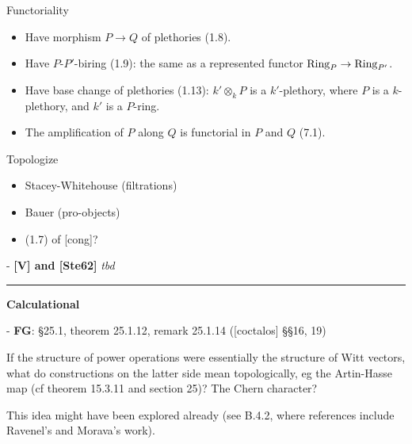 \documentclass{rs}
\theoremstyle{definition}
\theoremstyle{remark}
\renewcommand{\=}{\approx}
\renewcommand{\-}{\sim}
\numberwithin{equation}{section}
\numberwithin{thm}{section}
\begin{document}
Functoriality
\begin{itemize}
 \item Have morphism $P \to Q$ of plethories (1.8).

 \item Have $P$-$P'$-biring (1.9): the same as a represented functor ${\rm Ring}_P \to {\rm Ring}_{P'}$.

 \item Have base change of plethories (1.13): $k' \otimes_k P$ is a $k'$-plethory, where $P$ is a $k$-plethory, and $k'$ is a $P$-ring.

 \item The amplification of $P$ along $Q$ is functorial in $P$ and $Q$ (7.1).
\end{itemize}

Topologize
\begin{itemize}
 \item Stacey-Whitehouse (filtrations)

 \item Bauer (pro-objects)

 \item (1.7) of [cong]?
\end{itemize}


- \textbf{[V] and [Ste62]} {\em tbd}
\\

\hrule

\textbf{Calculational}

- \textbf{FG}: \S 25.1, theorem 25.1.12, remark 25.1.14 ([coctalos] \S\S 16, 19)

If the structure of power operations were essentially the structure of Witt vectors, what do constructions on the latter side mean topologically, eg the Artin-Hasse map (cf theorem 15.3.11 and section 25)? The Chern character?

This idea might have been explored already (see B.4.2, where references include Ravenel's and Morava's work).
\end{document}
